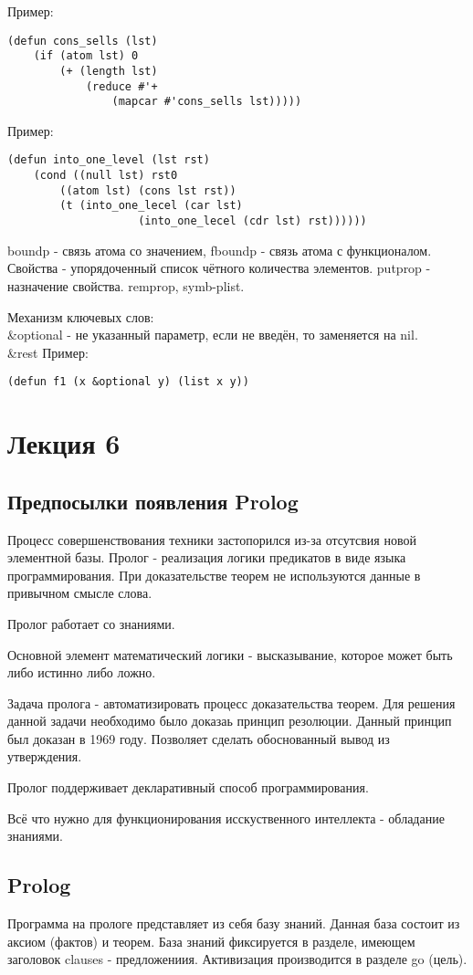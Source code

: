 Пример:
\begin{lstlisting}
(defun cons_sells (lst)
	(if (atom lst) 0
		(+ (length lst)
			(reduce #'+
				(mapcar #'cons_sells lst)))))
\end{lstlisting}

Пример:
\begin{lstlisting}
(defun into_one_level (lst rst)
	(cond ((null lst) rst0
		((atom lst) (cons lst rst))
		(t (into_one_lecel (car lst)
					(into_one_lecel (cdr lst) rst))))))
\end{lstlisting}

boundp - связь атома со значением, fboundp - связь атома с функционалом. Свойства - упорядоченный список чётного количества элементов. putprop - назначение свойства. remprop, symb-plist.

Механизм ключевых слов:\\
\&optional - не указанный параметр, если не введён, то заменяется на nil.\\
\&rest
Пример:
\begin{lstlisting}
(defun f1 (x &optional y) (list x y))
\end{lstlisting}

\chapter{Лекция 6}
\section{Предпосылки появления Prolog}
Процесс совершенствования техники застопорился из-за отсутсвия новой элементной базы. Пролог - реализация логики предикатов в виде языка программирования. При доказательстве теорем не используются данные в привычном смысле слова.

Пролог работает со знаниями. 

Основной элемент математический логики - высказывание, которое может быть либо истинно либо ложно. 

Задача пролога - автоматизировать процесс доказательства теорем. Для решения данной задачи необходимо было доказаь принцип резолюции. Данный принцип был доказан в 1969 году. Позволяет сделать обоснованный вывод из утверждения. 

Пролог поддерживает декларативный способ программирования.

Всё что нужно для функционирования исскуственного интеллекта - обладание знаниями.

\section{Prolog}
Программа на прологе представляет из себя базу знаний. Данная база состоит из аксиом (фактов) и теорем. База знаний фиксируется в разделе, имеющем заголовок clauses - предложениия. Активизация производится в разделе go (цель).

